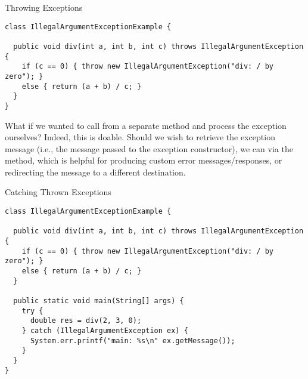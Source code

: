 \begin{cl}[]{Throwing Exceptions} 
\begin{lstlisting}[language=MyJava]
class IllegalArgumentExceptionExample {
  
  public void div(int a, int b, int c) throws IllegalArgumentException {
    if (c == 0) { throw new IllegalArgumentException("div: / by zero"); }
    else { return (a + b) / c; }
  }
}
\end{lstlisting}
\end{cl}

What if we wanted to call  from a separate method and process the exception ourselves? Indeed, this is doable. Should we wish to retrieve the exception message (i.e., the message passed to the exception constructor), we can via the  method, which is helpful for producing custom error messages/responses, or redirecting the message to a different destination.

\begin{cl}[]{Catching Thrown Exceptions}
\begin{lstlisting}[language=MyJava]
class IllegalArgumentExceptionExample {
  
  public void div(int a, int b, int c) throws IllegalArgumentException {
    if (c == 0) { throw new IllegalArgumentException("div: / by zero"); }
    else { return (a + b) / c; }
  }

  public static void main(String[] args) {
    try {
      double res = div(2, 3, 0);
    } catch (IllegalArgumentException ex) {
      System.err.printf("main: %s\n" ex.getMessage());
    }
  }
}
\end{lstlisting}
\end{cl}


